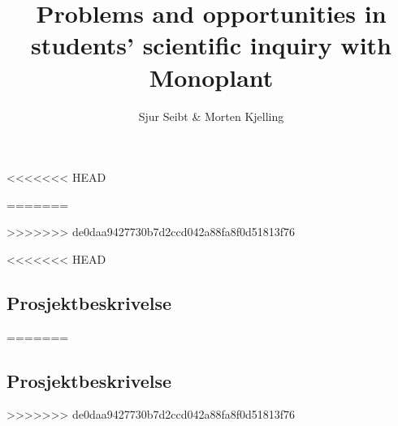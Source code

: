 \documentclass[a4paper, 12pt, english]{report}
\title{Problems and opportunities in students' scientific inquiry with Monoplant}
\author{Sjur Seibt \& Morten Kjelling}
\begin{document}
\uiosloforside[kind={Master thesis}]


\tableofcontents
\newpage
\listoffigures
\newpage
\listoftables
\newpage

<<<<<<< HEAD
 
 
 
 
 
 
 
=======







>>>>>>> de0daa9427730b7d2ccd042a88fa8f0d51813f76






<<<<<<< HEAD
 \newpage
 \begin{appendices}
 
 
 
 \chapter{Prosjektbeskrivelse}
 
 \label{prosjektbeskrivelse}
 \newpage
 
 \end{appendices}
=======
\newpage
\begin{appendices}



\chapter{Prosjektbeskrivelse}

\label{prosjektbeskrivelse}
\newpage

\end{appendices}
>>>>>>> de0daa9427730b7d2ccd042a88fa8f0d51813f76
\end{document}
